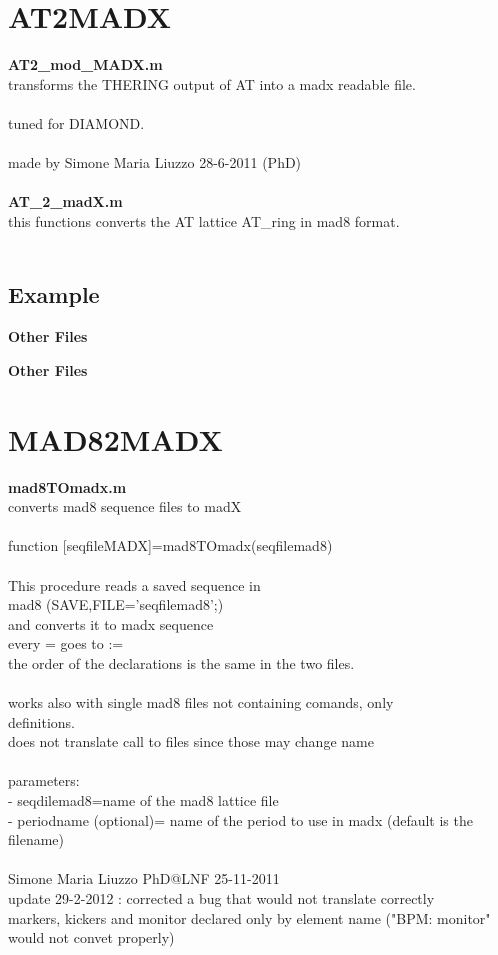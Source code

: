 \documentclass[a4paper,12pt]{report}
\begin{document}
\chapter{AT2MADX}

{\bf AT2\_mod\_MADX.m}\\
  transforms the THERING output of AT into a madx readable file. \\
  \\
  tuned for DIAMOND.\\
  \\
  made by Simone Maria Liuzzo 28-6-2011 (PhD)\\
\\

{\bf AT\_2\_madX.m}\\
  this functions converts the AT lattice AT\_ring in mad8 format.\\
\\
\section{Example}
{\bf  Other Files}


{\bf  Other Files}


\chapter{MAD82MADX}

{\bf mad8TOmadx.m}\\
  converts mad8 sequence files to madX\\
 \\
 function [seqfileMADX]=mad8TOmadx(seqfilemad8)\\
 \\
  This procedure reads a saved sequence in\\
  mad8 (SAVE,FILE='seqfilemad8';)\\
  and converts it to madx sequence\\
  every = goes to :=\\
  the order of the declarations is the same in the two files.\\
 \\
  works also with single mad8 files not containing comands, only\\
  definitions.\\
  does not translate call to files since those may change name\\
  \\
  parameters:\\
     - seqdilemad8=name of the mad8 lattice file\\
     - periodname (optional)= name of the period to use in madx (default is the filename)\\
  \\
  Simone Maria Liuzzo PhD@LNF 25-11-2011\\
      update 29-2-2012 : corrected a bug that would not translate correctly\\
      markers, kickers and monitor declared only by element name ("BPM: monitor" would not convet properly)\\
\\
\end{document}
